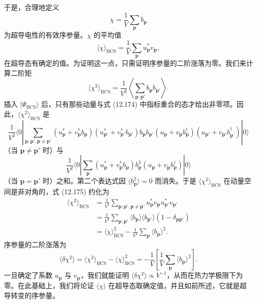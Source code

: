 于是，合理地定义
\begin{equation*}
\chi=\frac{1}{V}\sum_{\mathbf p}b_{\mathbf p} \tag{12.172}
\end{equation*}
为超导电性的有效序参量。$\chi$ 的平均值
\begin{equation*}
\langle\chi\rangle_{\mathrm{BCS}}=\frac{1}{V}\sum_{\mathbf p}u^*_{\mathbf p}v_{\mathbf p}, \tag{12.173}
\end{equation*}
在超导态有确定的值。为证明这一点，只需证明序参量的二阶涨落为零。我们来计算二阶矩
\begin{equation*}
\langle\chi^2\rangle_{\mathrm{BCS}}=\frac{1}{V^2}\left\langle\sum_{\mathbf p,\mathbf p'}b_{\mathbf p}b_{\mathbf p'}\right\rangle. \tag{12.174}
\end{equation*}
插入 $|\Psi_{\mathrm{BCS}}\rangle$ 后，只有那些动量与式 (12.174) 中指标重合的态才给出非零项。因此，$\langle\chi^2\rangle_{\mathrm{BCS}}$ 是
\begin{equation*}
\frac{1}{V^2}\langle 0|\sum_{\mathbf p,\mathbf p',\mathbf p\neq\mathbf p'}\left(u^*_{\mathbf p}+v^*_{\mathbf p}b_{\mathbf p}\right)\left(u^*_{\mathbf p'}+v^*_{\mathbf p'}b_{\mathbf p'}\right)b_{\mathbf p}b_{\mathbf p'}\left(u_{\mathbf p}+v_{\mathbf p}b^\dagger_{\mathbf p}\right)\left(u_{\mathbf p'}+v_{\mathbf p'}b^\dagger_{\mathbf p'}\right)|0\rangle \tag{12.175}
\end{equation*}
（当 $\mathbf p\neq\mathbf p'$ 时）与
\begin{equation*}
\frac{1}{V^2}\langle 0|\sum_{\mathbf p}\left(u^*_{\mathbf p}+v^*_{\mathbf p}b_{\mathbf p}\right)b^2_{\mathbf p}\left(u_{\mathbf p}+v_{\mathbf p}b^\dagger_{\mathbf p}\right)|0\rangle \tag{12.176}
\end{equation*}
（当 $\mathbf p=\mathbf p'$ 时）之和。第二个表达式因 $\langle b^2_{\mathbf p}\rangle=0$ 而消失。于是 $\langle\chi^2\rangle_{\mathrm{BCS}}$ 在动量空间是非对角的，式 (12.175) 约化为
\begin{align*}
\langle\chi^2\rangle_{\mathrm{BCS}}&=\frac{1}{V^2}\sum_{\mathbf p,\mathbf p',\mathbf p\neq\mathbf p'}u^*_{\mathbf p}v_{\mathbf p}u^*_{\mathbf p'}v_{\mathbf p'}\\
&=\frac{1}{V^2}\sum_{\mathbf p,\mathbf p'}\langle b_{\mathbf p}\rangle\langle b_{\mathbf p'}\rangle\left(1-\delta_{\mathbf p\mathbf p'}\right)\\
&=\langle\chi\rangle^2_{\mathrm{BCS}}-\frac{1}{V^2}\sum_{\mathbf p}\langle b_{\mathbf p}\rangle^2. \tag{12.177}
\end{align*}
序参量的二阶涨落为
\begin{equation*}
\langle\delta\chi^2\rangle=\langle\chi^2\rangle_{\mathrm{BCS}}-\langle\chi\rangle^2_{\mathrm{BCS}}=-\frac{1}{V}\left[\frac{1}{V}\sum_{\mathbf p}\langle b_{\mathbf p}\rangle^2\right]. \tag{12.178}
\end{equation*}
一旦确定了系数 $u_{\mathbf p}$ 与 $v_{\mathbf p}$，我们就能证明 $\langle\delta\chi^2\rangle\propto V^{-1}$，从而在热力学极限下为零。在此基础上，我们将论证 $\langle\chi\rangle$ 在超导态取确定值，并且如前所述，它就是超导转变的序参量。


